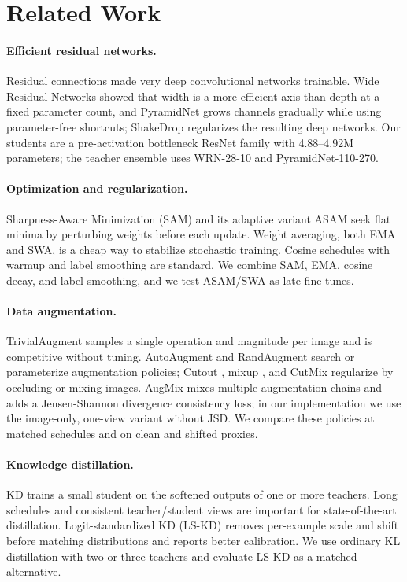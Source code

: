 \section{Related Work}
\label{sec:related}

\paragraph{Efficient residual networks.}
Residual connections \citep{he2016deep} made very deep convolutional networks
trainable. Wide Residual Networks \citep{zagoruyko2016wide} showed that width is
a more efficient axis than depth at a fixed parameter count, and PyramidNet
\citep{han2017deep} grows channels gradually while using parameter-free shortcuts;
ShakeDrop regularizes the resulting deep networks.
Our students are a pre-activation bottleneck ResNet family with 4.88--4.92M
parameters; the teacher ensemble uses WRN-28-10 and PyramidNet-110-270.

\paragraph{Optimization and regularization.}
Sharpness-Aware Minimization (SAM) \citep{foret2021sharpness} and its adaptive
variant ASAM \citep{kwon2021asam} seek flat minima by perturbing weights before
each update. Weight averaging, both EMA and SWA, is a cheap way to stabilize
stochastic training. Cosine schedules with warmup and label smoothing are
standard. We combine SAM, EMA, cosine decay, and label smoothing, and we test
ASAM/SWA as late fine-tunes.

\paragraph{Data augmentation.}
TrivialAugment \citep{muller2021trivialaugment} samples a single operation and
magnitude per image and is competitive without tuning. AutoAugment
\citep{cubuk2019autoaugment} and RandAugment \citep{cubuk2020randaugment} search
or parameterize augmentation policies; Cutout \citep{devries2017cutout}, mixup
\citep{zhang2018mixup}, and CutMix \citep{yun2019cutmix} regularize by occluding
or mixing images. AugMix \citep{hendrycks2021augmix} mixes multiple
augmentation chains and adds a Jensen-Shannon divergence consistency loss; in
our implementation we use the image-only, one-view variant without JSD. We
compare these policies at matched schedules and on clean and shifted proxies.

\paragraph{Knowledge distillation.}
KD \citep{hinton2015distilling} trains a small student on the softened outputs of
one or more teachers. Long schedules and consistent teacher/student views are
important for state-of-the-art distillation. Logit-standardized KD (LS-KD) \citep{sun2024logit} removes per-example scale and
shift before matching distributions and reports better calibration. We use
ordinary KL distillation with two or three teachers and evaluate LS-KD as a
matched alternative.

